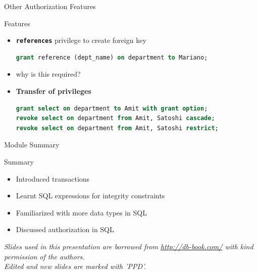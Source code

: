 \documentclass[aspectratio=169, xcolor=dvipsnames]{beamer}
\begin{document}
\begin{frame}[fragile]{Other Authorization Features}
    \begin{block}{Features}
        \begin{itemize}[<+->]
            \item \textbf{\texttt{references}} privilege to create foreign key
            \begin{lstlisting}[language=SQL]
grant reference (dept_name) on department to Mariano;
            \end{lstlisting}
            \item why is this required?
            \item \textbf{Transfer of privileges}
            \begin{lstlisting}[language=SQL]
grant select on department to Amit with grant option;
revoke select on department from Amit, Satoshi cascade;
revoke select on department from Amit, Satoshi restrict;
            \end{lstlisting}
        \end{itemize}
    \end{block}
\end{frame}

\begin{frame}{Module Summary}
    \begin{block}{Summary}
        \begin{itemize}[<+->]
            \item Introduced transactions
            \item Learnt SQL expressions for integrity constraints
            \item Familiarized with more data types in SQL
            \item Discussed authorization in SQL
        \end{itemize}
    \end{block}
    \vspace{2em}
    \begin{center}
    \small \textit{Slides used in this presentation are borrowed from \url{http://db-book.com/} with kind permission of the authors.} \\
    \small \textit{Edited and new slides are marked with 'PPD'.}
    \end{center}
\end{frame}
\end{document}

